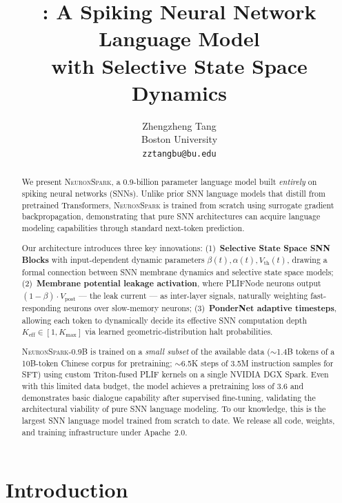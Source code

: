 \documentclass[10pt,twocolumn]{article}
\title{
    \model{}: A Spiking Neural Network Language Model \\
    with Selective State Space Dynamics
}
\author{
    Zhengzheng Tang \\
    Boston University \\
    \texttt{zztangbu@bu.edu}
}
\date{}
\newcommand{\model}{\textsc{NeuronSpark}}
\newcommand{\vpost}{V_{\text{post}}}
\newcommand{\vth}{V_{\text{th}}}
\begin{document}
\maketitle

\begin{abstract}
We present \model{}, a 0.9-billion parameter language model built \emph{entirely} on spiking neural networks (SNNs).
Unlike prior SNN language models that distill from pretrained Transformers, \model{} is trained from scratch using surrogate gradient backpropagation, demonstrating that pure SNN architectures can acquire language modeling capabilities through standard next-token prediction.

Our architecture introduces three key innovations:
(1)~\textbf{Selective State Space SNN Blocks} with input-dependent dynamic parameters $\beta(t), \alpha(t), \vth(t)$, drawing a formal connection between SNN membrane dynamics and selective state space models;
(2)~\textbf{Membrane potential leakage activation}, where PLIFNode neurons output $(1-\beta)\cdot\vpost$ --- the leak current --- as inter-layer signals, naturally weighting fast-responding neurons over slow-memory neurons;
(3)~\textbf{PonderNet adaptive timesteps}, allowing each token to dynamically decide its effective SNN computation depth $K_{\text{eff}} \in [1, K_{\max}]$ via learned geometric-distribution halt probabilities.

\model{}-0.9B is trained on a \emph{small subset} of the available data ($\sim$1.4B tokens of a 10B-token Chinese corpus for pretraining; $\sim$6.5K steps of 3.5M instruction samples for SFT) using custom Triton-fused PLIF kernels on a single NVIDIA DGX Spark.
Even with this limited data budget, the model achieves a pretraining loss of 3.6 and demonstrates basic dialogue capability after supervised fine-tuning, validating the architectural viability of pure SNN language modeling.
To our knowledge, this is the largest SNN language model trained from scratch to date.
We release all code, weights, and training infrastructure under Apache~2.0.
\end{abstract}

\section{Introduction}
\label{sec:intro}
\end{document}
